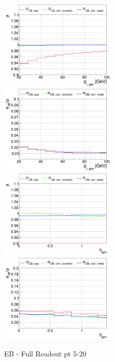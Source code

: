 \begin{figure}
\includegraphics[width=0.495\textwidth]{./ECAL_plots/plotsNOPU/EB/FULL/pdf/GENPT/EBFULL_GENPT_0020_0100_MuOverBins.pdf}
\includegraphics[width=0.495\textwidth]{./ECAL_plots/plotsNOPU/EB/FULL/pdf/GENPT/EBFULL_GENPT_0020_0100_EffSigmaOverBins.pdf}
\includegraphics[width=0.495\textwidth]{./ECAL_plots/plotsNOPU/EB/FULL/pdf/GENETA/EBFULL_GENETA_0005_0020_MuOverBins.pdf}
\includegraphics[width=0.495\textwidth]{./ECAL_plots/plotsPU/EB/FULL/pdf/GENETA/EBFULL_GENETA_0005_0020_EffSigmaOverBins.pdf}
\caption{EB - Full Readout pt 5-20}
\end{figure}


